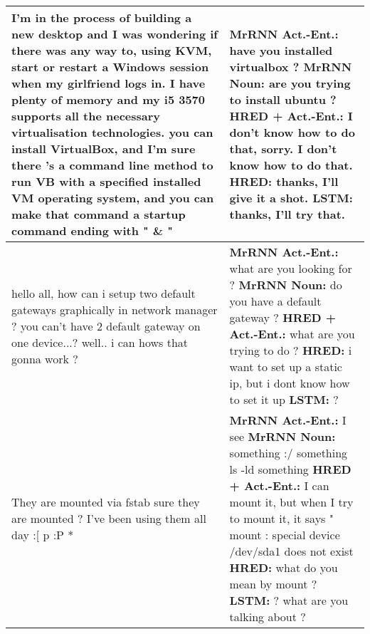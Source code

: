 \documentclass{article}
\begin{document}
\begin{table}[ht]
\begin{tabular}{p{65mm}|p{60mm}}
        I'm in the process of building a new desktop and I was wondering if there was any way to, using KVM, start or restart a Windows session when my girlfriend logs in. I have plenty of memory and my i5 3570 supports all the necessary virtualisation technologies.  you can install VirtualBox, and I'm sure there 's a command line method to run VB with a specified installed VM operating system, and you can make that command a startup command ending with " \& " & \textbf{MrRNN Act.\@ -Ent.\@:} have you installed virtualbox ? \newline \textbf{MrRNN Noun:} are you trying to install ubuntu ? \newline \textbf{HRED + Act.\@-Ent.\@:} I don't know how to do that, sorry. I don't know how to do that. \newline \textbf{HRED:} thanks, I'll give it a shot. \newline \textbf{LSTM:} thanks, I'll try that. \\ \hline 
        hello all, how can i setup two default gateways graphically in network manager ?  you can't have 2 default gateway on one device...?  well.. i can  hows that gonna work ? & \textbf{MrRNN Act.\@ -Ent.\@:} what are you looking for ? \newline \textbf{MrRNN Noun:} do you have a default gateway ? \newline \textbf{HRED + Act.\@-Ent.\@:} what are you trying to do ? \newline \textbf{HRED:} i want to set up a static ip, but i dont know how to set it up \newline \textbf{LSTM:} ? \\ \hline 
        They are mounted via fstab  sure they are mounted ?  I've been using them all day :[ p :P * & \textbf{MrRNN Act.\@ -Ent.\@:} I see \newline \textbf{MrRNN Noun:} something :/ something ls -ld something \newline \textbf{HRED + Act.\@-Ent.\@:} I can mount it, but when I try to mount it, it says " mount : special device /dev/sda1 does not exist \newline \textbf{HRED:} what do you mean by mount ? \newline \textbf{LSTM:} ? what are you talking about ? \\ \hline
 \end{tabular}
\end{table}
\end{document}
